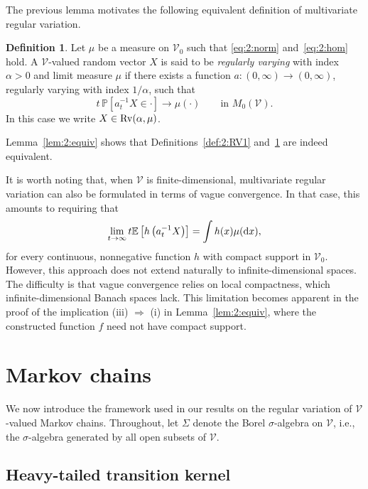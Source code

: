 \documentclass[preprint,12pt]{elsarticle}
\theoremstyle{definition}
\newtheorem{df}[thm]{Definition}
\theoremstyle{remark}
\newcommand{\xbf}{{ x}}
\newcommand{\Xbf}{{ X}}
\newcommand{\1}{{\mathbf 1}}
\numberwithin{equation}{section}
\newcommand{\Ebb}{\mathbb{E}}  %
\newcommand{\Pbb}{\mathbb{P}}
\newcommand{\ud}{{\rm d}}
\newcommand{\Rvrm}{{\rm Rv}}
\newcommand{\Vcal}{\mathcal{V}}
\begin{document}
  The previous lemma motivates the following equivalent definition of 
  multivariate regular variation.

  \begin{df}\label{df:4:RV2}
	  Let $\mu$ be a measure on $\Vcal_0$ such that \eqref{eq:2:norm} and~\eqref{eq:2:hom} hold. 
	  A $\Vcal$-valued random vector $\Xbf$ is said to be \emph{regularly varying} 
	  with index $\alpha>0$ and limit measure $\mu$ if there exists a function 
	  $a:(0,\infty)\to(0,\infty)$, regularly varying with index $1/\alpha$, such that
	  \[
		  t\,\Pbb[a_t^{-1}\Xbf\in\cdot]\to\mu(\cdot)
		  \qquad \text{in } M_0(\Vcal).
	  \]
	  In this case we write $\Xbf\in\Rvrm(\alpha,\mu)$.
  \end{df}

  Lemma~\ref{lem:2:equiv} shows that Definitions~\ref{def:2:RV1} and~\ref{df:4:RV2}
  are indeed equivalent.

  It is worth noting that, when $\Vcal$ is finite-dimensional, multivariate regular
  variation can also be formulated in terms of vague convergence. In that case, this amounts to requiring that
  \begin{equation*}
    \lim_{t\to\infty} t\Ebb\left[h\left(a_t^{-1}\Xbf\right)\right]
    = \int h(\xbf)\mu(\ud\xbf),
  \end{equation*}
  for every continuous, nonnegative function $h$ with compact support in $\Vcal_0$.
  However, this approach does not extend naturally to infinite-dimensional spaces.
  The difficulty is that vague convergence relies on local compactness, which
  infinite-dimensional Banach spaces lack. This limitation becomes apparent in the
  proof of the implication (iii) $\Rightarrow$ (i) in Lemma~\ref{lem:2:equiv}, where the
  constructed function $f$ need not have compact support.

\section{Markov chains}\label{sec:MC}

  We now introduce the framework used in our results 
  on the regular variation of $\Vcal$-valued Markov chains. 
  Throughout, let $\Sigma$ denote the Borel $\sigma$-algebra 
  on $\Vcal$, i.e., the $\sigma$-algebra generated by all open subsets of $\Vcal$. 

\subsection{Heavy-tailed transition kernel}
\end{document}
